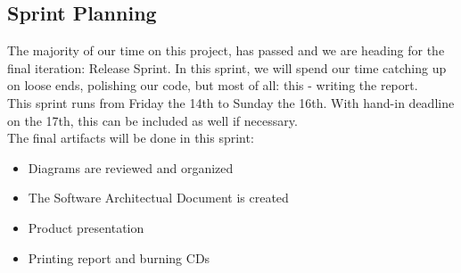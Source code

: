 \subsection{Sprint Planning}
The majority of our time on this project, has passed and we are heading for the final iteration: Release Sprint. In this sprint, we will spend our time catching up on loose ends, polishing our code, but most of all: this - writing the report.\\
This sprint runs from Friday the 14th to Sunday the 16th. With hand-in deadline on the 17th, this can be included as well if necessary.\\
The final artifacts will be done in this sprint: 
\begin{itemize}
\item Diagrams are reviewed and organized
\item The Software Architectual Document is created
\item Product presentation 
\item Printing report and burning CDs
\end{itemize}